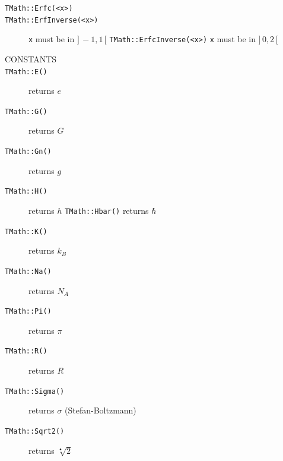 \documentclass[10pt, twoside]{article}
\newcommand{\ttt}[1]{\colorbox{boxgray}{\texttt{#1}}}
\begin{document}
\begin{description}
\item[\ttt{TMath::Erfc(<x>)}]
\item[\ttt{TMath::ErfInverse(<x>)}] \texttt{x} must be in $\big] \, -1, 1 \, \big[$ \ttt{TMath::ErfcInverse(<x>)} \texttt{x} must be in $\big] \, 0, 2 \, \big[$
\item[CONSTANTS]
\item[\ttt{TMath::E()}] returns $e$
\item[\ttt{TMath::G()}] returns $G$
\item[\ttt{TMath::Gn()}] returns $g$
\item[\ttt{TMath::H()}] returns $h$ \ttt{TMath::Hbar()} returns $\hbar$
\item[\ttt{TMath::K()}] returns $k_B$
\item[\ttt{TMath::Na()}] returns $N_A$
\item[\ttt{TMath::Pi()}] returns $\pi$
\item[\ttt{TMath::R()}] returns $R$
\item[\ttt{TMath::Sigma()}] returns $\sigma$ (Stefan-Boltzmann)
\item[\ttt{TMath::Sqrt2()}] returns $\sqrt[•]{2}$
\end{description}
\end{document}
